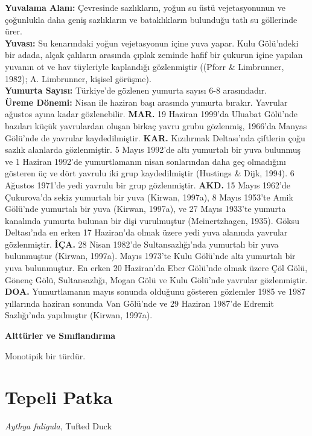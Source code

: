 \documentclass[
  a4paper,
  DIV=11,
  numbers=noendperiod]{scrreprt}
\begin{document}
\textbf{Yuvalama Alanı:} Çevresinde sazlıkların, yoğun su üstü
vejetasyonunun ve çoğunlukla daha geniş sazlıkların ve bataklıkların
bulunduğu tatlı su göllerinde ürer.\\
\textbf{Yuvası:} Su kenarındaki yoğun vejetasyonun içine yuva yapar.
Kulu Gölü'ndeki bir adada, alçak çalıların arasında çıplak zeminde hafif
bir çukurun içine yapılan yuvanın ot ve hav tüyleriyle kaplandığı
gözlenmiştir ((Pforr \& Limbrunner, 1982); A. Limbrunner, kişisel
görüşme).\\
\textbf{Yumurta Sayısı:} Türkiye'de gözlenen yumurta sayısı 6-8
arasındadır.\\
\textbf{Üreme Dönemi:} Nisan ile haziran başı arasında yumurta bırakır.
Yavrular ağustos ayına kadar gözlenebilir. \textbf{MAR.} 19 Haziran
1999'da Uluabat Gölü'nde bazıları küçük yavrulardan oluşan birkaç yavru
grubu gözlenmiş, 1966'da Manyas Gölü'nde de yavrular kaydedilmiştir.
\textbf{KAR.} Kızılırmak Deltası'nda çiftlerin çoğu sazlık alanlarda
gözlenmiştir. 5 Mayıs 1992'de altı yumurtalı bir yuva bulunmuş ve 1
Haziran 1992'de yumurtlamanın nisan sonlarından daha geç olmadığını
gösteren üç ve dört yavrulu iki grup kaydedilmiştir (Hustings \& Dijk,
1994). 6 Ağustos 1971'de yedi yavrulu bir grup gözlenmiştir.
\textbf{AKD.} 15 Mayıs 1962'de Çukurova'da sekiz yumurtalı bir yuva
(Kirwan, 1997a), 8 Mayıs 1953'te Amik Gölü'nde yumurtalı bir yuva
(Kirwan, 1997a), ve 27 Mayıs 1933'te yumurta kanalında yumurta bulunan
bir dişi vurulmuştur (Meinertzhagen, 1935). Göksu Deltası'nda en erken
17 Haziran'da olmak üzere yedi yuva alanında yavrular gözlenmiştir.
\textbf{İÇA.} 28 Nisan 1982'de Sultansazlığı'nda yumurtalı bir yuva
bulunmuştur (Kirwan, 1997a). Mayıs 1973'te Kulu Gölü'nde altı yumurtalı
bir yuva bulunmuştur. En erken 20 Haziran'da Eber Gölü'nde olmak üzere
Çöl Gölü, Gönenç Gölü, Sultansazlığı, Mogan Gölü ve Kulu Gölü'nde
yavrular gözlenmiştir. \textbf{DOA.} Yumurtlamanın mayıs sonunda
olduğunu gösteren gözlemler 1985 ve 1987 yıllarında haziran sonunda Van
Gölü'nde ve 29 Haziran 1987'de Edremit Sazlığı'nda yapılmıştır (Kirwan,
1997a).

\textbf{Alttürler ve Sınıflandırma}

Monotipik bir türdür.

\section{Tepeli Patka}\label{tepeli-patka}

\emph{Aythya fuligula}, Tufted Duck
\end{document}
